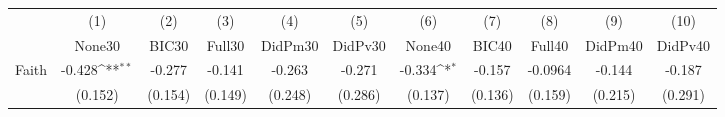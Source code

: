 {
\def\sym#1{\ifmmode^{#1}\else\(^{#1}\)\fi}
\begin{tabular}{l*{10}{c}}
\toprule
            &\multicolumn{1}{c}{(1)}&\multicolumn{1}{c}{(2)}&\multicolumn{1}{c}{(3)}&\multicolumn{1}{c}{(4)}&\multicolumn{1}{c}{(5)}&\multicolumn{1}{c}{(6)}&\multicolumn{1}{c}{(7)}&\multicolumn{1}{c}{(8)}&\multicolumn{1}{c}{(9)}&\multicolumn{1}{c}{(10)}\\
            &\multicolumn{1}{c}{None30}&\multicolumn{1}{c}{BIC30}&\multicolumn{1}{c}{Full30}&\multicolumn{1}{c}{DidPm30}&\multicolumn{1}{c}{DidPv30}&\multicolumn{1}{c}{None40}&\multicolumn{1}{c}{BIC40}&\multicolumn{1}{c}{Full40}&\multicolumn{1}{c}{DidPm40}&\multicolumn{1}{c}{DidPv40}\\
\midrule
Faith       &      -0.428\sym{**} &      -0.277         &      -0.141         &      -0.263         &      -0.271         &      -0.334\sym{*}  &      -0.157         &     -0.0964         &      -0.144         &      -0.187         \\
            &     (0.152)         &     (0.154)         &     (0.149)         &     (0.248)         &     (0.286)         &     (0.137)         &     (0.136)         &     (0.159)         &     (0.215)         &     (0.291)         \\
\bottomrule
\end{tabular}
}
